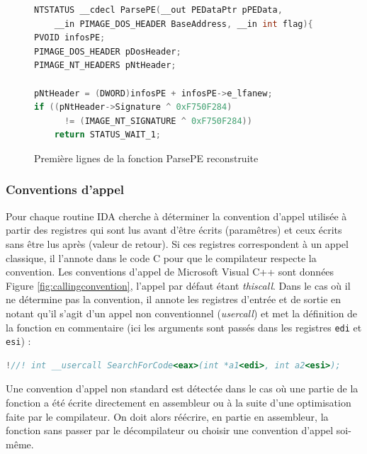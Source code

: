 \begin{figure}[h]
\begin{lstlisting}[language={C}]
NTSTATUS __cdecl ParsePE(__out PEDataPtr pPEData, 
    __in PIMAGE_DOS_HEADER BaseAddress, __in int flag){
PVOID infosPE;
PIMAGE_DOS_HEADER pDosHeader;
PIMAGE_NT_HEADERS pNtHeader;

pNtHeader = (DWORD)infosPE + infosPE->e_lfanew;
if ((pNtHeader->Signature ^ 0xF750F284) 
      != (IMAGE_NT_SIGNATURE ^ 0xF750F284)) 
    return STATUS_WAIT_1; 
\end{lstlisting}
\caption{Première lignes de la fonction ParsePE reconstruite\label{fig:ParsePEFinal}}
\end{figure}

\subsubsection{Conventions d'appel}

Pour chaque routine IDA cherche à déterminer la convention d'appel utilisée à partir des registres qui sont lus avant d'être écrits (paramêtres) et ceux écrits sans être lus après (valeur de retour). Si ces registres correspondent à un appel classique, il l'annote dans le code C pour que le compilateur respecte la convention. Les conventions d'appel de Microsoft Visual C++ sont données Figure \ref{fig:callingconvention}, l'appel par défaut étant \emph{thiscall}. Dans le cas où il ne détermine pas la convention, il annote les registres d'entrée et de sortie en notant qu'il s'agit d'un appel non conventionnel (\emph{usercall}) et met la définition de la fonction en commentaire (ici les arguments sont passés dans les registres \texttt{edi} et \texttt{esi}) :
\begin{small}
\begin{lstlisting}[language={C}, escapechar=!]
!//! int __usercall SearchForCode<eax>(int *a1<edi>, int a2<esi>);
\end{lstlisting}
\end{small}

Une convention d'appel non standard est détectée dans le cas où une partie de la fonction a été écrite directement en assembleur ou à la suite d'une optimisation faite par le compilateur. On doit alors réécrire, en partie en assembleur, la fonction sans passer par le décompilateur ou choisir une convention d'appel soi-même.

